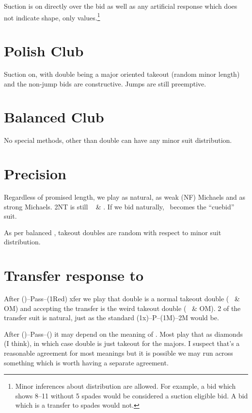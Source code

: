 \documentclass[main]{subfile}
\begin{document}
	Suction is on directly over the  bid as well as any artificial response which does not indicate shape, only values.\footnote{Minor inferences about distribution are allowed. For example, a  bid which shows 8--11 without 5 spades would be considered a suction eligible bid. A  bid which is a transfer to spades would not.}
	
	\section{Polish Club}
	
	Suction on, with double being a major oriented takeout (random minor length) and the non-jump bids are constructive. Jumps are still preemptive.
	
	\section{Balanced Club}
	
	No special methods, other than double can have any minor suit distribution.
	
	\section[Precision 1D]{Precision }
	
	Regardless of promised length, we play  as natural,  as weak (NF) Michaels and  as strong Michaels. 2NT is still \hhh~ \& \ccc. If we bid  naturally, \ccc ~becomes the ``cuebid'' suit.
	
	As per balanced , takeout doubles are random with respect to minor suit distribution.
	
	\section[Transfer response to 1C]{Transfer response to }
	
	After ()--Pass--(1Red) xfer we play that double is a normal takeout double (\ddd~ \& OM) and accepting the transfer is the weird takeout double (\ccc~ \& OM). 2 of the transfer suit is natural, just as the standard (1x)--P--(1M)--2M would be.
	
	After ()--Pass--() it may depend on the meaning of . Most play that as diamonds (I think), in which case double is just takeout for the majors. I suspect that's a reasonable agreement for most  meanings but it is possible we may run across something which is worth having a separate agreement.
	
\end{document}
